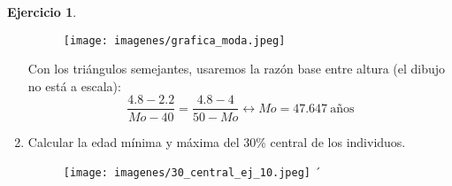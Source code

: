 \documentclass[a4paper, 12pt]{article}
\theoremstyle{definition}
\newtheorem{ej}{Ejercicio}
\begin{document}
\begin{ej}
\begin{enumerate}[label=\textit{\alph*)}]
    \begin{figure}[h!]
    \centering
    \texttt{[image: imagenes/grafica\_moda.jpeg]}
	\end{figure}
	
    Con los triángulos semejantes, usaremos la razón base entre altura (el dibujo no está a escala): \\
    $$\frac{4.8-2.2}{Mo - 40} = \frac{4.8 - 4}{50 - Mo} \longleftrightarrow Mo= 47.647 \ \text{años} $$
    \item Calcular la edad mínima y máxima del 30\% central de los individuos.\\
    
    \begin{figure}[h!]
    \centering
    \texttt{[image: imagenes/30\_central\_ej\_10.jpeg]}
	´\end{figure}


\end{enumerate}
\end{ej}
\end{document}

